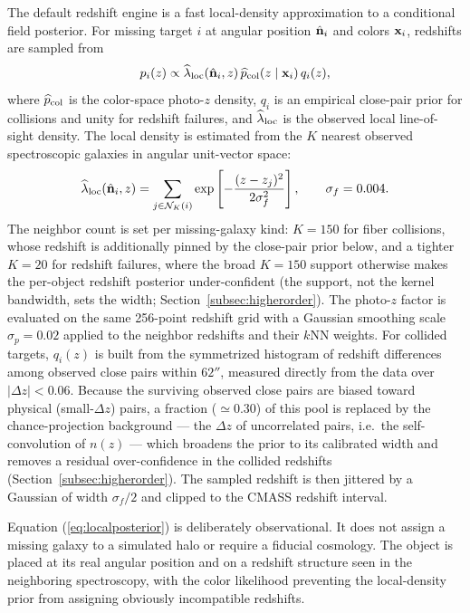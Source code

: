 \documentclass[apj]{emulateapj}
\begin{document}
The default redshift engine is a fast local-density approximation to a
conditional field posterior.  For missing target $i$ at angular position
$\hat{\bf n}_i$ and colors ${\bf x}_i$, redshifts are sampled from
\begin{equation}
  p_i(z) \propto
  \widehat{\lambda}_{\rm loc}(\hat{\bf n}_i,z)\,
  \widehat{p}_{\rm col}(z\mid{\bf x}_i)\,
  q_i(z),
  \label{eq:localposterior}
\end{equation}
where $\widehat{p}_{\rm col}$ is the color-space photo-$z$ density, $q_i$ is an
empirical close-pair prior for collisions and unity for redshift failures, and
$\widehat{\lambda}_{\rm loc}$ is the observed local line-of-sight density.  The
local density is estimated from the $K$ nearest observed spectroscopic
galaxies in angular unit-vector space:
\begin{equation}
  \widehat{\lambda}_{\rm loc}(\hat{\bf n}_i,z) =
  \sum_{j\in{\cal N}_K(i)}
  \exp\left[-\frac{(z-z_j)^2}{2\sigma_f^2}\right],
  \qquad \sigma_f=0.004 .
\end{equation}
The neighbor count is set per missing-galaxy kind: $K=150$ for fiber collisions,
whose redshift is additionally pinned by the close-pair prior below, and a tighter
$K=20$ for redshift failures, where the broad $K=150$ support otherwise makes the
per-object redshift posterior under-confident (the support, not the kernel
bandwidth, sets the width; Section~\ref{subsec:higherorder}).
The photo-$z$ factor is evaluated on the same 256-point redshift grid with a
Gaussian smoothing scale $\sigma_p=0.02$ applied to the neighbor redshifts and
their $k$NN weights.  For collided targets, $q_i(z)$ is built from the symmetrized
histogram of redshift differences among observed close pairs within $62''$,
measured directly from the data over $|\Delta z|<0.06$.  Because the surviving
observed close pairs are biased toward physical (small-$\Delta z$) pairs, a
fraction ($\simeq0.30$) of this pool is replaced by the chance-projection
background --- the $\Delta z$ of uncorrelated pairs, i.e.\ the self-convolution of
$n(z)$ --- which broadens the prior to its calibrated width and removes a residual
over-confidence in the collided redshifts (Section~\ref{subsec:higherorder}).  The
sampled redshift is then jittered by a Gaussian of width $\sigma_f/2$ and clipped
to the CMASS redshift interval.

Equation (\ref{eq:localposterior}) is deliberately observational.  It does not
assign a missing galaxy to a simulated halo or require a fiducial cosmology.
The object is placed at its real angular position and on a redshift structure
seen in the neighboring spectroscopy, with the color likelihood preventing the
local-density prior from assigning obviously incompatible redshifts.
\end{document}
